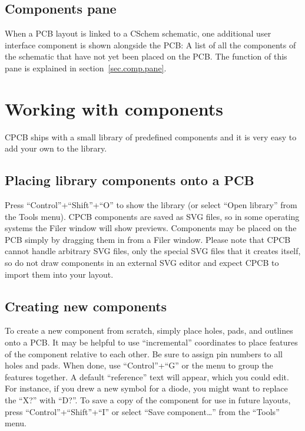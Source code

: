\documentclass[11pt]{report}
\begin{document}
\subsection{Components pane}

When a PCB layout is linked to a CSchem schematic, one additional user
interface component is shown alongside the PCB: A list of all the
components of the schematic that have not yet been placed on the
PCB. The function of this pane is explained in section~\ref{sec.comp.pane}.

\section{Working with components}\label{sec.comp}

CPCB ships with a small library of predefined components and it is
very easy to add your own to the library.

\subsection{Placing library components onto a PCB}

Press
``Control''+``Shift''+``O'' to show the library (or select ``Open
library'' from the Tools menu). CPCB components are saved as SVG
files, so in some operating systems the Filer window will show
previews. Components may be placed on the PCB simply by dragging them
in from a Filer window. Please note that CPCB cannot handle arbitrary
SVG files, only the special SVG files that it creates itself, so do
not draw components in an external SVG editor and expect CPCB to
import them into your layout.

\subsection{Creating new components}

To create a new component from scratch, simply place holes, pads, and
outlines onto a PCB. It may be helpful to use ``incremental''
coordinates to place features of the component relative to each
other. Be sure to assign pin numbers to all holes and pads. When done,
use ``Control''+``G'' or the menu to group the features together. A
default ``reference'' text will appear, which you could edit. For
instance, if you drew a new symbol for a diode, you might want to
replace the ``X?'' with ``D?''. To save a copy of the component for
use in future layouts, press ``Control''+``Shift''+``I'' or select
``Save component…'' from the ``Tools'' menu.
\end{document}
